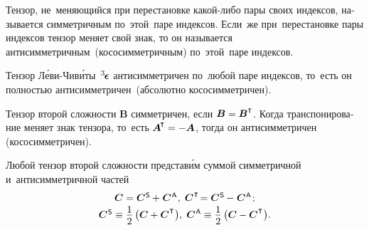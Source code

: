 \begin{otherlanguage}{russian}
\end{otherlanguage}



\label{para:tensors.symmetric+skewsymmetric}

\begin{otherlanguage}{russian}

Тензор, не~меняющийся при перестановке какой\hbox{-}либо пары своих индексов, называется симметричным по~этой~паре индексов. Если~же при~перестановке пары индексов тензор меняет свой знак, то он называется антисимметричным~(кососимметричным) по~этой~паре индексов.

Тензор Л\'{е}ви\hbox{-\!}Чив\'{и}ты~${^3\hspace{-0.25ex}\bm{\epsilon}}\hspace{.05ex}$ антисимметричен по~любой паре индексов, то~есть он полностью антисимметричен~(абсолютно кососимметричен).

Тензор второй сложности ${\bm{B}}$ симметричен, если ${\bm{B} = \bm{B}^\T}$. Когда транспонирование меняет знак тензора, то~есть ${\bm{A}^{\hspace{-0.1em}\T} = - \bm{A}}$, тогда он антисимметричен (кососимметричен).

Любой тензор второй сложности представ\'{и}м суммой симметричной и~антисимметричной частей
\vspace{0.2em}\begin{equation}\begin{array}{c}
\bm{C} = \bm{C}^{\mathsf{\hspace{0.1ex}S}} \hspace{-0.1ex}+\hspace{0.1ex} \bm{C}^{\mathsf{\hspace{0.1ex}A}}\hspace{0.1ex} , \;
\bm{C}^{\hspace{0.1ex}\T} \hspace{-0.32ex} = \bm{C}^{\mathsf{\hspace{0.1ex}S}} \hspace{-0.1ex}-\hspace{0.1ex} \bm{C}^{\mathsf{\hspace{0.1ex}A}}\hspace{0.2ex} ; \\[0.2em]
\bm{C}^{\mathsf{\hspace{0.1ex}S}} \equiv \displaystyle \onehalf \left({\bm{C} + \bm{C}^{\hspace{0.1ex}\T}}\hspace{0.1ex}\right)\!, \;
\bm{C}^{\mathsf{\hspace{0.1ex}A}} \equiv \displaystyle \onehalf \left({\bm{C} - \bm{C}^{\hspace{0.1ex}\T}}\hspace{0.1ex}\right)\!.
\end{array}\end{equation}


\end{otherlanguage}
